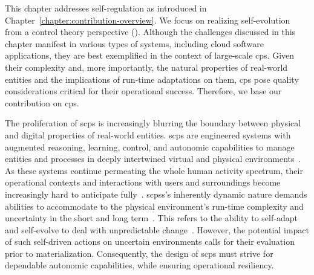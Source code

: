 \label{chapter:reference-architecture}

\minitoc

This chapter addresses self-regulation as introduced in Chapter~\ref{chapter:contribution-overview}. We focus on realizing self-evolution from a control theory perspective (). Although the challenges discussed in this chapter manifest in various types of systems, including cloud software applications, they are best exemplified in the context of large-scale \gls{cps}. Given their complexity and, more importantly, the natural properties of real-world entities and the implications of run-time adaptations on them, \gls{cps} pose quality considerations critical for their operational success. Therefore, we base our contribution on \gls{cps}.

The proliferation of \gls{scps} is increasingly blurring the boundary between physical and digital properties of real-world entities. \gls{scps} are engineered systems with augmented reasoning, learning, control, and autonomic capabilities to manage entities and processes in deeply intertwined virtual and physical environments~\cite{tavcar-2019-review}. %
As these systems continue permeating the whole human activity spectrum, their operational contexts and interactions with users and surroundings become increasingly hard to anticipate fully~\cite{zeng-2016-one,zhao-2018-systems,bennaceur-2019-modelling}. \glspl{scps}'s inherently dynamic nature demands abilities to accommodate to the physical environment's run-time complexity and uncertainty in the short and long term~\cite{muller-2017-rise,tavcar-2019-review}. This refers to the ability to self-adapt and self-evolve to deal with unpredictable change~\cite{bennaceur-2019-modelling}. However, the potential impact of such self-driven actions on uncertain environments calls for their evaluation prior to materialization. Consequently, the design of \gls{scps} must strive for dependable autonomic capabilities, while ensuring operational resiliency.

